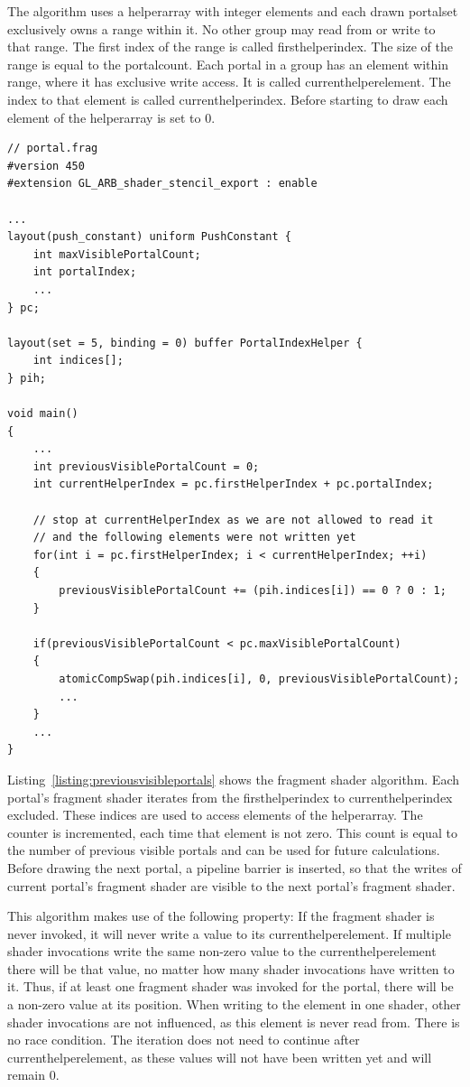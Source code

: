 The algorithm uses a \gls{helperarray} with integer elements and each drawn \gls{portalset} exclusively owns a range within it. No other group may read from or write to that range. The first index of the range is called \gls{firsthelperindex}. The size of the range is equal to the \gls{portalcount}. Each portal in a group has an element within range, where it has exclusive write access. It is called \gls{currenthelperelement}. The index to that element is called \gls{currenthelperindex}. Before starting to draw each element of the \gls{helperarray} is set to 0.

\begin{lstlisting}[caption={Calculate Previous Visible Portals}, label=listing:previousvisibleportals]
// portal.frag
#version 450
#extension GL_ARB_shader_stencil_export : enable

...
layout(push_constant) uniform PushConstant {	
	int maxVisiblePortalCount;
	int portalIndex;
	...
} pc;

layout(set = 5, binding = 0) buffer PortalIndexHelper {
	int indices[];
} pih;

void main()
{
	...
	int previousVisiblePortalCount = 0;
	int currentHelperIndex = pc.firstHelperIndex + pc.portalIndex;
	
	// stop at currentHelperIndex as we are not allowed to read it
	// and the following elements were not written yet
	for(int i = pc.firstHelperIndex; i < currentHelperIndex; ++i)
	{
		previousVisiblePortalCount += (pih.indices[i]) == 0 ? 0 : 1;
	}
	
	if(previousVisiblePortalCount < pc.maxVisiblePortalCount)
	{
		atomicCompSwap(pih.indices[i], 0, previousVisiblePortalCount);
		...
	}
	...
}
\end{lstlisting}

Listing~\ref{listing:previousvisibleportals} shows the fragment shader algorithm. Each portal's fragment shader iterates from the \gls{firsthelperindex} to \gls{currenthelperindex} excluded. These indices are used to access elements of the \gls{helperarray}.  The counter is incremented, each time that element is not zero. This count is equal to the number of previous visible portals and can be used for future calculations. Before drawing the next portal, a pipeline barrier is inserted, so that the writes of current portal's fragment shader are visible to the next portal's fragment shader.

This algorithm makes use of the following property: If the fragment shader is never invoked, it will never write a value to its \gls{currenthelperelement}. If multiple shader invocations write the same non-zero value to the \gls{currenthelperelement} there will be that value, no matter how many shader invocations have written to it.
Thus, if at least one fragment shader was invoked for the portal, there will be a non-zero value at its position. When writing to the element in one shader, other shader invocations are not influenced, as this element is never read from. There is no race condition. The iteration does not need to continue after \gls{currenthelperelement}, as these values will not have been written yet and will remain 0.

